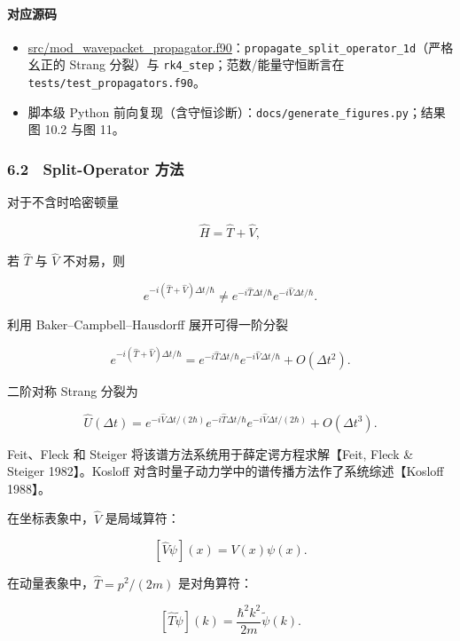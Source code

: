 \documentclass[
]{ctexbook}
\providecommand{\tightlist}{%
  \setlength{\itemsep}{0pt}\setlength{\parskip}{0pt}}
\begin{document}
\hypertarget{ux5bf9ux5e94ux6e90ux7801-15}{%
\paragraph{对应源码}\label{ux5bf9ux5e94ux6e90ux7801-15}}

\begin{itemize}
\tightlist
\item
  \href{https://github.com/l1Ha/QuantumGeneralModule/blob/main/src/mod_wavepacket_propagator.f90}{src/mod\_wavepacket\_propagator.f90}：\texttt{propagate\_split\_operator\_1d}（严格幺正的
  Strang 分裂）与 \texttt{rk4\_step}；范数/能量守恒断言在
  \texttt{tests/test\_propagators.f90}。
\item
  脚本级 Python
  前向复现（含守恒诊断）：\texttt{docs/generate\_figures.py}；结果图
  10.2 与图 11。
\end{itemize}

\hypertarget{split-operator-ux65b9ux6cd5}{%
\subsubsection{6.2　Split-Operator
方法}\label{split-operator-ux65b9ux6cd5}}

对于不含时哈密顿量

\[
\hat H=\hat T+\hat V,
\]

若 \(\hat T\) 与 \(\hat V\) 不对易，则

\[
e^{-i(\hat T+\hat V)\Delta t/\hbar}
\ne
e^{-i\hat T\Delta t/\hbar}
e^{-i\hat V\Delta t/\hbar}.
\]

利用 Baker--Campbell--Hausdorff 展开可得一阶分裂

\[
e^{-i(\hat T+\hat V)\Delta t/\hbar}
=
e^{-i\hat T\Delta t/\hbar}
e^{-i\hat V\Delta t/\hbar}
+
O(\Delta t^2).
\]

二阶对称 Strang 分裂为

\[
\hat U(\Delta t)
=
e^{-i\hat V\Delta t/(2\hbar)}
e^{-i\hat T\Delta t/\hbar}
e^{-i\hat V\Delta t/(2\hbar)}
+
O(\Delta t^3).
\]

Feit、Fleck 和 Steiger 将该谱方法系统用于薛定谔方程求解【Feit, Fleck \&
Steiger 1982】。Kosloff
对含时量子动力学中的谱传播方法作了系统综述【Kosloff 1988】。

在坐标表象中，\(\hat V\) 是局域算符：

\[
[\hat V\psi](x)=V(x)\psi(x).
\]

在动量表象中，\(\hat T=p^2/(2m)\) 是对角算符：

\[
[\hat T\tilde\psi](k)=\frac{\hbar^2 k^2}{2m}\tilde\psi(k).
\]
\end{document}

